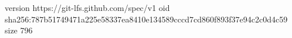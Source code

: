version https://git-lfs.github.com/spec/v1
oid sha256:787b51749471a225e58337ea8410e134589cccd7cd860f893f37e94c2c0d4c59
size 796
